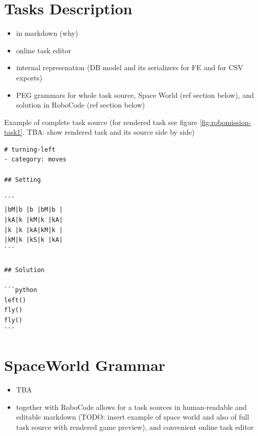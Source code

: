 \section{Tasks Description}

\begin{itemize}
\item in markdown (why)
\item online task editor
\item internal represenation (DB model and its serializers for FE and for CSV exports)
\item PEG grammars for whole task source, Space World (ref section below),
  and solution in RoboCode (ref section below)
\end{itemize}

Example of complete task source (for rendered task see figure \ref{fig:robomission-task1}. TBA: show rendered task and its source side by side)

\begin{lstlisting}
# turning-left
- category: moves

## Setting

```
|bM|b |b |bM|b |
|kA|k |kM|k |kA|
|k |k |kA|kM|k |
|kM|k |kS|k |kA|
```

## Solution

```python
left()
fly()
fly()
```
\end{lstlisting}


\section{SpaceWorld Grammar}

\begin{itemize}
\item TBA
\item together with RoboCode allows for a task sources in human-readable and editable markdown (TODO: insert example of space world and also of full task source with rendered game preview), and convenient online task editor
\end{itemize}


